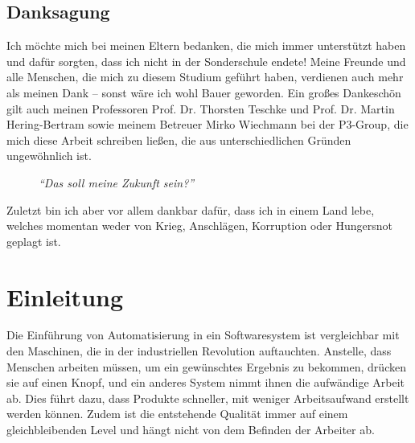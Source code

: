   \subsection*{Danksagung}
  \label{ssec:Danksagung}
    Ich möchte mich bei meinen Eltern bedanken, die mich immer unterstützt haben und dafür sorgten, dass ich nicht in der Sonderschule endete! Meine Freunde und alle Menschen, die mich zu diesem Studium geführt haben, verdienen auch mehr als meinen Dank -- sonst wäre ich wohl Bauer geworden. Ein großes Dankeschön gilt auch meinen Professoren
Prof. Dr. Thorsten Teschke und
Prof. Dr. Martin Hering-Bertram
     sowie meinem Betreuer Mirko Wiechmann bei der P3-Group, die mich diese Arbeit schreiben ließen, die aus unterschiedlichen Gründen ungewöhnlich ist.
    \begin{figure}[H]
      \centering
      \caption{\textit{``Das soll meine Zukunft sein?''}}
    \end{figure}

    Zuletzt bin ich aber vor allem dankbar dafür, dass ich in einem Land lebe, welches momentan weder von Krieg, Anschlägen, Korruption oder Hungersnot geplagt ist.

\section{Einleitung}
\label{sec:Einleitung}
  Die Einführung von Automatisierung in ein Softwaresystem ist vergleichbar mit den Maschinen, die in der industriellen Revolution auftauchten. Anstelle, dass Menschen arbeiten müssen, um ein gewünschtes Ergebnis zu bekommen, drücken sie auf einen Knopf, und ein anderes System nimmt ihnen die aufwändige Arbeit ab. Dies führt dazu, dass Produkte schneller, mit weniger Arbeitsaufwand erstellt werden können. Zudem ist die entstehende Qualität immer auf einem gleichbleibenden Level und hängt nicht von dem Befinden der Arbeiter ab.


